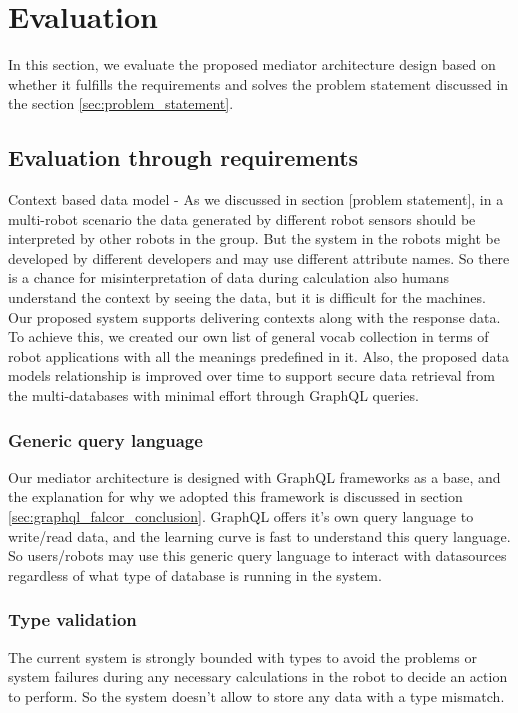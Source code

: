 

	\let\cleardoublepage\clearpage
\chapter{Evaluation} \label{sec:evaluation}
In this section, we evaluate the proposed mediator architecture design based on whether it fulfills the requirements and solves the problem statement discussed in the section \ref{sec:problem_statement}. 

\section{Evaluation through requirements}
Context based data model - As we discussed in section [problem statement], in a multi-robot scenario the data generated by different robot sensors should be interpreted by other robots in the group. But the system in the robots might be developed by different developers and may use different attribute names. So there is a chance for misinterpretation of data during calculation also humans understand the context by seeing the data, but it is difficult for the machines. Our proposed system supports delivering contexts along with the response data. To achieve this, we created our own list of general vocab collection in terms of robot applications with all the meanings predefined in it. Also, the proposed data models relationship is improved over time to support secure data retrieval from the multi-databases with minimal effort through GraphQL queries.

\subsection{Generic query language}
Our mediator architecture is designed with GraphQL frameworks as a base, and the explanation for why we adopted this framework is discussed in section \ref{sec:graphql_falcor_conclusion}. GraphQL offers it's own query language to write/read data, and the learning curve is fast to understand this query language. So users/robots may use this generic query language to interact with datasources regardless of what type of database is running in the system.

\subsection{Type validation}
The current system is strongly bounded with types to avoid the problems or system failures during any necessary calculations in the robot to decide an action to perform. So the system doesn't allow to store any data with a type mismatch. 

